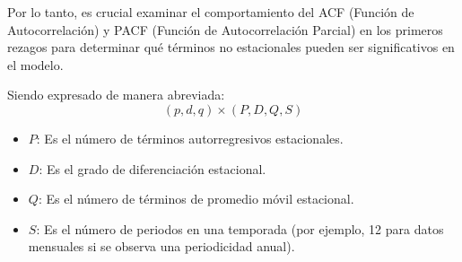 \begin{itemize}
    Por lo tanto, es crucial examinar el comportamiento del ACF (Función de Autocorrelación) y PACF (Función de Autocorrelación Parcial) en los primeros rezagos para determinar qué términos no estacionales pueden ser significativos en el modelo.
     
    Siendo expresado de manera abreviada: 
    \begin{equation*}
        (p,d,q) \times (P, D, Q, S)
    \end{equation*}

    \begin{itemize}
        \item \( P \): Es el número de términos autorregresivos estacionales.
        \item \( D \): Es el grado de diferenciación estacional.
        \item \( Q \): Es el número de términos de promedio móvil estacional.
        \item \( S \): Es el número de periodos en una temporada (por ejemplo, 12 para datos mensuales si se observa una periodicidad anual).
    \end{itemize}

\end{itemize}
